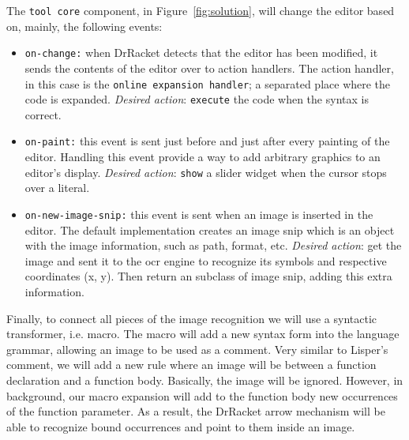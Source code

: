 The \texttt{tool core} component, in Figure~\ref{fig:solution}, will change the editor based on, mainly, the following events:

\begin{itemize}
	\item \texttt{on-change:} when DrRacket detects that the editor has been modified, it sends the contents of the editor over to action handlers.
	The action handler, in this case is the \texttt{online expansion handler}; a separated place where the code is expanded. \textit{Desired action}: \texttt{execute} the code when the syntax is correct. 

	\item \texttt{on-paint:} this event is sent just before and just after every painting of the editor. Handling this event provide a way to add arbitrary graphics to an editor's display. \textit{Desired action}: \texttt{show} a slider widget when the cursor stops over a literal.

	\item \texttt{on-new-image-snip:} this event is sent when an image is inserted in the editor. The default implementation creates an image snip which is an object with the image information, such as path, format, etc. \textit{Desired action}: get the image and sent it to the \ac{ocr} engine to recognize its symbols and respective coordinates (x, y). Then return an subclass of image snip, adding this extra information.
\end{itemize}

Finally, to connect all pieces of the image recognition we will use a syntactic transformer, i.e. macro. The macro will add a new syntax form into the language grammar, allowing an image to be used as a comment. Very similar to Lisper's comment, we will add a new rule where an image will be between a function declaration and a function body. Basically, the image will be ignored. However, in background, our macro expansion will add to the function body new occurrences of the function parameter. As a result, the DrRacket arrow mechanism will be able to recognize bound occurrences and point to them inside an image.

